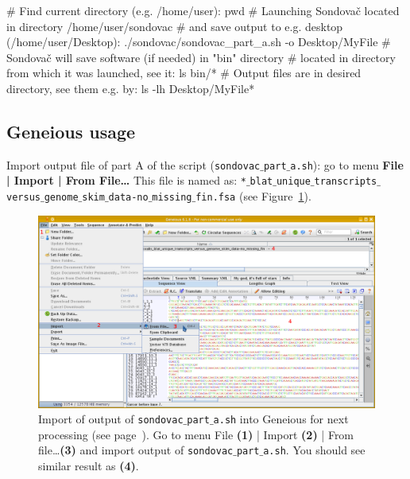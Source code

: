 \documentclass[a4paper, 11pt, twoside]{article}
\begin{document}
\begin{bashcode}
  # Find current directory (e.g. /home/user):
  pwd
  # Launching Sondovač located in directory /home/user/sondovac
  # and save output to e.g. desktop (/home/user/Desktop):
  ./sondovac/sondovac_part_a.sh -o Desktop/MyFile
  # Sondovač will save software (if needed) in "bin" directory
  # located in directory from which it was launched, see it:
  ls bin/*
  # Output files are in desired directory, see them e.g. by:
  ls -lh Desktop/MyFile*
\end{bashcode}

\subsection{Geneious usage}
\label{geneious-usage}

Import output file of part A of the script (\texttt{sondovac$\_$part$\_$a.sh}): go to menu \textbf{File | Import | From File\ldots} This file is named as: \texttt{*$\_$\allowbreak blat$\_$\allowbreak unique$\_$\allowbreak transcripts$\_$\allowbreak versus$\_$\allowbreak genome$\_$\allowbreak skim$\_$\allowbreak data-no$\_$\allowbreak missing$\_$\allowbreak fin.fsa} (see Figure~\ref{geneious-import}).

\begin{figure}[htb]
  \includegraphics[width=\textwidth]{geneious1.png}
  \caption[Import into Geneious]{Import of output of \texttt{sondovac$\_$part$\_$a.sh} into Geneious for next processing (see page~\pageref{pipeline-overview}). Go to menu File \textbf{(1)} | Import \textbf{(2)} | From file\ldots \textbf{(3)} and import output of \texttt{sondovac$\_$part$\_$a.sh}. You should see similar result as \textbf{(4)}.}
  \label{geneious-import}
\end{figure}
\end{document}
